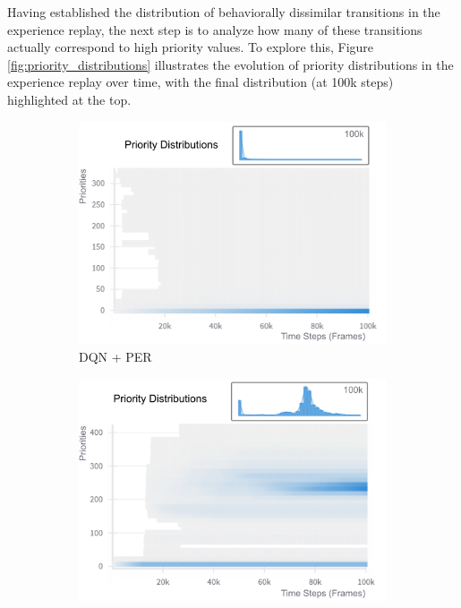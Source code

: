 Having established the distribution of behaviorally dissimilar transitions in the experience replay, the next step is to analyze how many of these transitions actually correspond to high priority values. To explore this, Figure \ref{fig:priority_distributions} illustrates the evolution of priority distributions in the experience replay over time, with the final distribution (at 100k steps) highlighted at the top.

\begin{figure}[H]
    \centering
    \begin{subfigure}{0.32\textwidth}
    \includegraphics[width=\linewidth]{Results/grid_world/priority_distribution_dqn_per.png}
        \caption{DQN + PER}
        \label{fig:priority_distribution_per}
    \end{subfigure}
    \hfill
    \begin{subfigure}{0.32\textwidth}
        \includegraphics[width=\linewidth]{Results/grid_world/priority_distribution_dqn_mico_bpercn.png}

\end{subfigure}
\end{figure}
